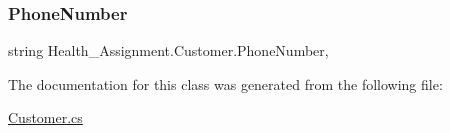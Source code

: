 \mbox{\label{class_health___assignment_1_1_customer_a63694ce18bab053aecff306df8b9b0bf}} 
\subsubsection{\texorpdfstring{Phone\+Number}{PhoneNumber}}
{\footnotesize\ttfamily string Health\+\_\+\+Assignment.\+Customer.\+Phone\+Number\hspace{0.3cm}{\ttfamily [get]}, {\ttfamily [set]}}



The documentation for this class was generated from the following file\+:\begin{DoxyCompactItemize}
\item 
\hyperlink{_customer_8cs}{Customer.\+cs}\end{DoxyCompactItemize}

